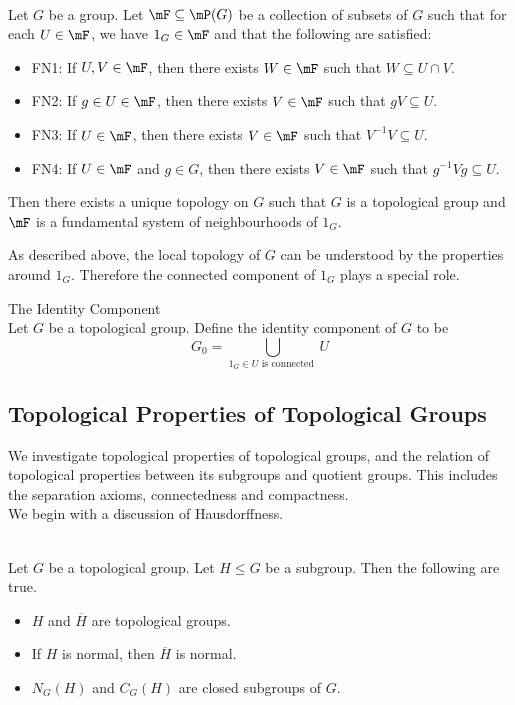 \documentclass[a4paper]{article}
\begin{document}
\begin{prp}{}{}\\
Let $G$ be a group. Let $\mF\subseteq\mP(G)$ be a collection of subsets of $G$ such that for each $U\in\mF$, we have $1_G\in\mF$ and that the following are satisfied: 
\begin{itemize}
\item FN1: If $U,V\in\mF$, then there exists $W\in\mF$ such that $W\subseteq U\cap V$. 
\item FN2: If $g\in U\in\mF$, then there exists $V\in\mF$ such that $gV\subseteq U$. 
\item FN3: If $U\in\mF$, then there exists $V\in\mF$ such that $V^{-1}V\subseteq U$. 
\item FN4: If $U\in\mF$ and $g\in G$, then there exists $V\in\mF$ such that $g^{-1}Vg\subseteq U$. 
\end{itemize}
Then there exists a unique topology on $G$ such that $G$ is a topological group and $\mF$ is a fundamental system of neighbourhoods of $1_G$. 
\end{prp}

As described above, the local topology of $G$ can be understood by the properties around $1_G$. Therefore the connected component of $1_G$ plays a special role. 

\begin{defn}{The Identity Component}{}\\
Let $G$ be a topological group. Define the identity component of $G$ to be $$G_0=\bigcup_{1_G\in U\text{ is connected }}U$$
\end{defn}

\subsection{Topological Properties of Topological Groups}
We investigate topological properties of topological groups, and the relation of topological properties between its subgroups and quotient groups. This includes the separation axioms, connectedness and compactness. \\

We begin with a discussion of Hausdorffness. 

\begin{prp}{}{}\\
Let $G$ be a topological group. Let $H\leq G$ be a subgroup. Then the following are true. 
\begin{itemize}
\item $H$ and $\overline{H}$ are topological groups. 
\item If $H$ is normal, then $\overline{H}$ is normal. 
\item $N_G(H)$ and $C_G(H)$ are closed subgroups of $G$. 
\end{itemize}
\end{prp}
\end{document}
